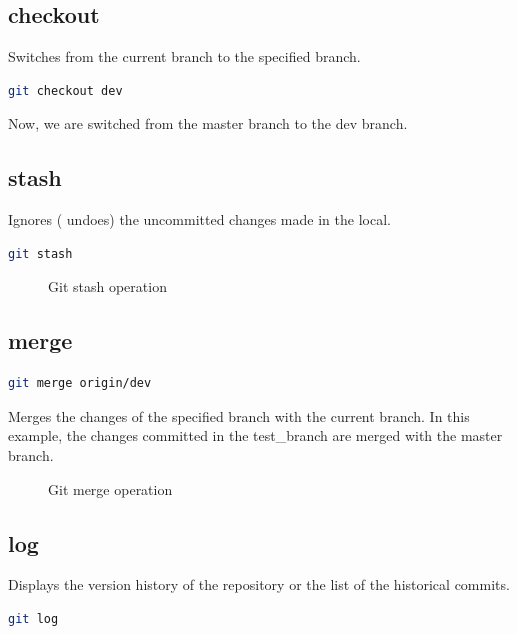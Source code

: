 \documentclass[letterpaper]{article}
\begin{document}
\subsection{checkout}
Switches from the current branch to the specified branch.

\begin{lstlisting}[language=Bash]
git checkout dev
\end{lstlisting}

Now, we are switched from the master branch to the dev branch.


\subsection{stash}
Ignores ( undoes) the uncommitted changes made in the local.
\begin{lstlisting}[language=Bash]
git stash
\end{lstlisting}

\begin{figure}[h]
    \centering
    \caption{Git stash operation}
  \end{figure}





\subsection{merge}
\begin{lstlisting}[language=Bash]
git merge origin/dev
\end{lstlisting}
Merges the changes of the specified branch with the current branch. In this example, the changes committed in the test\_branch are merged with the master branch. 

\begin{figure}[h]
    \centering
    \caption{Git merge operation}
  \end{figure}

\subsection{log}
Displays the version history of the repository or the list of the historical commits. 
\begin{lstlisting}[language=Bash]
git log
\end{lstlisting}
\end{document}
